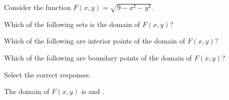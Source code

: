 \documentclass{ximera}
\author{Jim Talamo}
\begin{document}
\begin{exercise}
  Consider the function $F(x,y) = \sqrt{9-x^2-y^2}$.
  
  Which of the following sets is the domain of $F(x,y)$?
  \begin{multipleChoice}
  \choice{$\R$}
  \choice{$[0,\infty)$}
  \end{multipleChoice}
 
 Which of the following are interior points of the domain of $F(x,y)$?
 \begin{selectAll}
 \end{selectAll} 

 Which of the following are boundary points of the domain of $F(x,y)$?
 \begin{selectAll}
 \end{selectAll} 

Select the correct responses.

The domain of $F(x,y)$ is  and  .
  \end{exercise}
\end{document}
